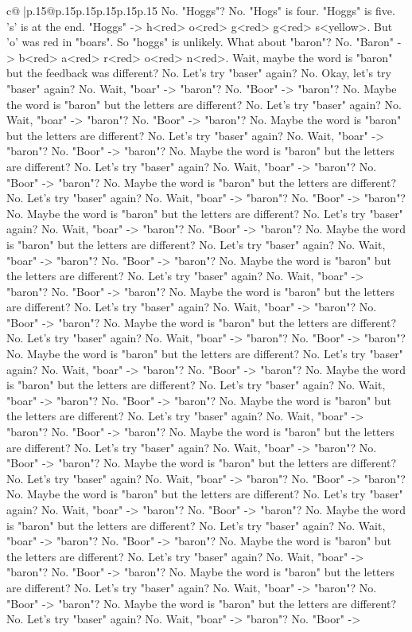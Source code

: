 \documentclass{article}
\begin{document}
{\begin{supertabular}{c@{$\;$}|p{.15\linewidth}@{}p{.15\linewidth}p{.15\linewidth}p{.15\linewidth}p{.15\linewidth}p{.15\linewidth}}
{{{No. "Hoggs"? No. "Hogs" is four. "Hoggs" is five. 's' is at the end. "Hoggs" {-}> h<red> o<red> g<red> g<red> s<yellow>. But 'o' was red in "boars". So "hoggs" is unlikely. What about "baron"? No. "Baron" {-}> b<red> a<red> r<red> o<red> n<red>. Wait, maybe the word is "baron" but the feedback was different? No. Let's try "baser" again? No. Okay, let's try "baser" again? No. Wait, "boar" {-}> "baron"? No. "Boor" {-}> "baron"? No. Maybe the word is "baron" but the letters are different? No. Let's try "baser" again? No. Wait, "boar" {-}> "baron"? No. "Boor" {-}> "baron"? No. Maybe the word is "baron" but the letters are different? No. Let's try "baser" again? No. Wait, "boar" {-}> "baron"? No. "Boor" {-}> "baron"? No. Maybe the word is "baron" but the letters are different? No. Let's try "baser" again? No. Wait, "boar" {-}> "baron"? No. "Boor" {-}> "baron"? No. Maybe the word is "baron" but the letters are different? No. Let's try "baser" again? No. Wait, "boar" {-}> "baron"? No. "Boor" {-}> "baron"? No. Maybe the word is "baron" but the letters are different? No. Let's try "baser" again? No. Wait, "boar" {-}> "baron"? No. "Boor" {-}> "baron"? No. Maybe the word is "baron" but the letters are different? No. Let's try "baser" again? No. Wait, "boar" {-}> "baron"? No. "Boor" {-}> "baron"? No. Maybe the word is "baron" but the letters are different? No. Let's try "baser" again? No. Wait, "boar" {-}> "baron"? No. "Boor" {-}> "baron"? No. Maybe the word is "baron" but the letters are different? No. Let's try "baser" again? No. Wait, "boar" {-}> "baron"? No. "Boor" {-}> "baron"? No. Maybe the word is "baron" but the letters are different? No. Let's try "baser" again? No. Wait, "boar" {-}> "baron"? No. "Boor" {-}> "baron"? No. Maybe the word is "baron" but the letters are different? No. Let's try "baser" again? No. Wait, "boar" {-}> "baron"? No. "Boor" {-}> "baron"? No. Maybe the word is "baron" but the letters are different? No. Let's try "baser" again? No. Wait, "boar" {-}> "baron"? No. "Boor" {-}> "baron"? No. Maybe the word is "baron" but the letters are different? No. Let's try "baser" again? No. Wait, "boar" {-}> "baron"? No. "Boor" {-}> "baron"? No. Maybe the word is "baron" but the letters are different? No. Let's try "baser" again? No. Wait, "boar" {-}> "baron"? No. "Boor" {-}> "baron"? No. Maybe the word is "baron" but the letters are different? No. Let's try "baser" again? No. Wait, "boar" {-}> "baron"? No. "Boor" {-}> "baron"? No. Maybe the word is "baron" but the letters are different? No. Let's try "baser" again? No. Wait, "boar" {-}> "baron"? No. "Boor" {-}> "baron"? No. Maybe the word is "baron" but the letters are different? No. Let's try "baser" again? No. Wait, "boar" {-}> "baron"? No. "Boor" {-}> "baron"? No. Maybe the word is "baron" but the letters are different? No. Let's try "baser" again? No. Wait, "boar" {-}> "baron"? No. "Boor" {-}> "baron"? No. Maybe the word is "baron" but the letters are different? No. Let's try "baser" again? No. Wait, "boar" {-}> "baron"? No. "Boor" {-}> "baron"? No. Maybe the word is "baron" but the letters are different? No. Let's try "baser" again? No. Wait, "boar" {-}> "baron"? No. "Boor" {-}> }}}
\end{supertabular}}
\end{document}
